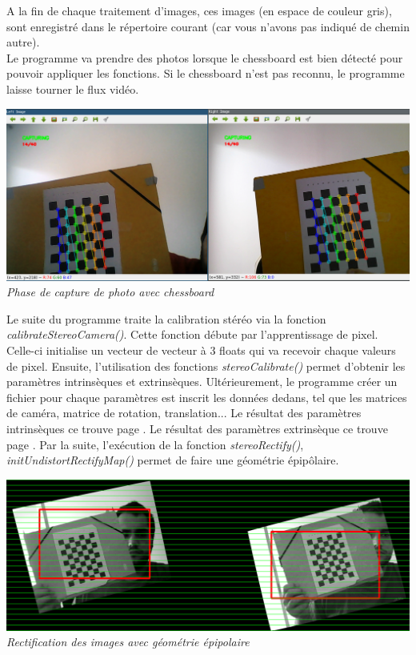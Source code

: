 \documentclass[12pt, french]{report}
\begin{document}
A la fin de chaque traitement d'images, ces images (en espace de couleur gris), sont enregistré dans le répertoire courant (car vous n'avons pas indiqué de chemin autre).\\

Le programme va prendre des photos lorsque le chessboard est bien détecté pour pouvoir appliquer les fonctions. Si le chessboard n'est pas reconnu, le programme laisse tourner le flux vidéo.\\

\begin{center}
    \includegraphics[width=\textwidth]{Images/Code/PhaseCapt.png}\\
    \textit{Phase de capture de photo avec chessboard}
\end{center}

Le suite du programme traite la calibration stéréo via la fonction \textit{calibrateStereoCamera()}. Cette fonction débute par l'apprentissage de pixel. Celle-ci initialise un vecteur de vecteur à 3 floats qui va recevoir chaque valeurs de pixel. \newline
Ensuite, l'utilisation des fonctions \textit{stereoCalibrate()} permet d'obtenir les paramètres intrinsèques et extrinsèques. Ultérieurement, le programme créer un fichier pour chaque paramètres est inscrit les données dedans, tel que les matrices de caméra, matrice de rotation, translation...
Le résultat des paramètres intrinsèques ce trouve page \pageref{Intrinsèques.yml}. Le résultat des paramètres extrinsèque ce trouve page \pageref{Extrinsèques.yml}. \newline
Par la suite, l'exécution de la fonction \textit{stereoRectify()}, \textit{initUndistortRectifyMap()}  permet de faire une géométrie épipôlaire.

\begin{center}
    \includegraphics[width=\textwidth]{Images/epipol.png}\\
    \textit{Rectification des images avec géométrie épipolaire}\\
    \end{center}
    
\end{document}
